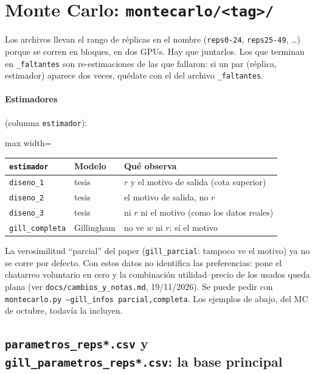 \documentclass[11pt]{article}
\newcommand{\col}[1]{\texttt{#1}}
\newcommand{\archivo}[1]{\textbf{\texttt{#1}}}
\begin{document}
\section{Monte Carlo: \texttt{montecarlo/<tag>/}}

Los archivos llevan el rango de réplicas en el nombre (\texttt{reps0-24}, \texttt{reps25-49},
\dots) porque se corren en bloques, en dos GPUs. Hay que juntarlos. Los que terminan en
\texttt{\_faltantes} son re-estimaciones de las que fallaron: si un par (réplica, estimador)
aparece dos veces, quédate con el del archivo \texttt{\_faltantes}.

\paragraph{Estimadores} (columna \col{estimador}):
\begin{center}\small
\begin{adjustbox}{max width=\textwidth}\begin{tabular}{lll}
\toprule
\col{estimador} & Modelo & Qué observa\\
\midrule
\col{diseno\_1} & tesis & $r$ y el motivo de salida (cota superior)\\
\col{diseno\_2} & tesis & el motivo de salida, no $r$\\
\col{diseno\_3} & tesis & ni $r$ ni el motivo (como los datos reales)\\
\col{gill\_completa} & Gillingham & no ve $w$ ni $r$; sí el motivo\\
\bottomrule
\end{tabular}\end{adjustbox}
\end{center}
La verosimilitud ``parcial'' del paper (\col{gill\_parcial}: tampoco ve el motivo) ya no se
corre por defecto. Con estos datos no identifica las preferencias: pone el chatarreo
voluntario en cero y la combinación utilidad--precio de los usados queda plana (ver
\texttt{docs/cambios\_y\_notas.md}, 19/11/2026). Se puede pedir con
\texttt{montecarlo.py --gill\_infos parcial,completa}. Los ejemplos de abajo, del MC de
octubre, todavía la incluyen.

\subsection{\archivo{parametros\_reps*.csv} y \archivo{gill\_parametros\_reps*.csv}: la base principal}
\end{document}
